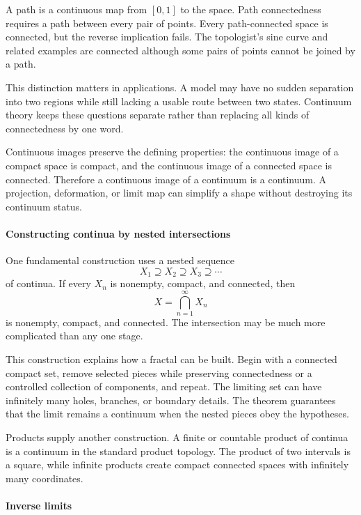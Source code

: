 A path is a continuous map from $[0,1]$ to the space. Path connectedness requires a path between every pair of points. Every path-connected space is connected, but the reverse implication fails. The topologist's sine curve and related examples are connected although some pairs of points cannot be joined by a path.

This distinction matters in applications. A model may have no sudden separation into two regions while still lacking a usable route between two states. Continuum theory keeps these questions separate rather than replacing all kinds of connectedness by one word.

Continuous images preserve the defining properties: the continuous image of a compact space is compact, and the continuous image of a connected space is connected. Therefore a continuous image of a continuum is a continuum. A projection, deformation, or limit map can simplify a shape without destroying its continuum status. \cite{continuum_theory_ref2}

\paragraph{Constructing continua by nested intersections}

One fundamental construction uses a nested sequence
\[
 X_1\supseteq X_2\supseteq X_3\supseteq\cdots
\]
of continua. If every $X_n$ is nonempty, compact, and connected, then
\[
 X=\bigcap_{n=1}^{\infty}X_n
\]
is nonempty, compact, and connected. The intersection may be much more complicated than any one stage.

This construction explains how a fractal can be built. Begin with a connected compact set, remove selected pieces while preserving connectedness or a controlled collection of components, and repeat. The limiting set can have infinitely many holes, branches, or boundary details. The theorem guarantees that the limit remains a continuum when the nested pieces obey the hypotheses.

Products supply another construction. A finite or countable product of continua is a continuum in the standard product topology. The product of two intervals is a square, while infinite products create compact connected spaces with infinitely many coordinates. \cite{continuum_theory_ref1,continuum_theory_ref4}

\paragraph{Inverse limits}

